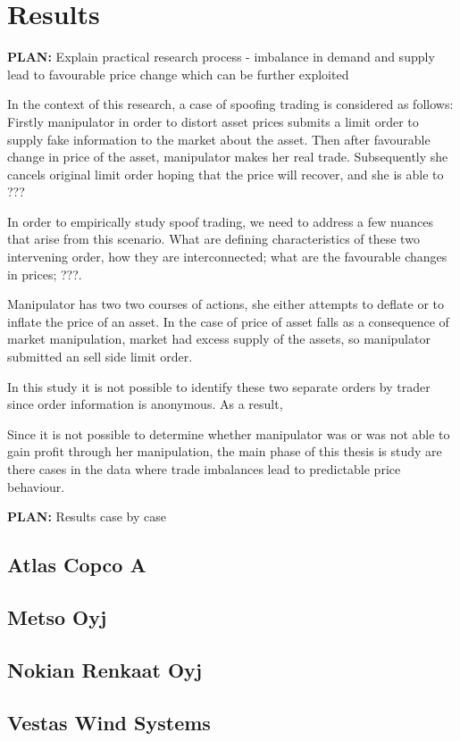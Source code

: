 \documentclass{tut-thesis}
\begin{document}
\chapter{Results}
\textbf{PLAN:} Explain practical research process
- imbalance in demand and supply lead to favourable price change which can be further exploited

In the context of this research, a case of spoofing trading is considered as follows: Firstly manipulator in order to distort asset prices submits a limit order to supply fake information to the market about the asset. Then after favourable change in price of the asset, manipulator makes her real trade. Subsequently she cancels original limit order hoping that the price will recover, and she is able to ???

In order to empirically study spoof trading, we need to address a few nuances that arise from this scenario. What are defining characteristics of these two intervening order, how they are interconnected; what are the favourable changes in prices; ???. 

Manipulator has two two courses of actions, she either attempts to deflate or to inflate the price of an asset. In the case of price of asset falls as a consequence of market manipulation, market had excess supply of the assets, so manipulator submitted an sell side limit order. 

In this study it is not possible to identify these two separate orders by trader since order information is anonymous. As a result, 

Since it is not possible to determine whether manipulator was or was not able to gain profit through her manipulation, the main phase of this thesis is study are there cases in the data where trade imbalances lead to predictable price behaviour.

\textbf{PLAN:} Results case by case
\section{Atlas Copco A}
\section{Metso Oyj}
\section{Nokian Renkaat Oyj}
\section{Vestas Wind Systems}
\end{document}
